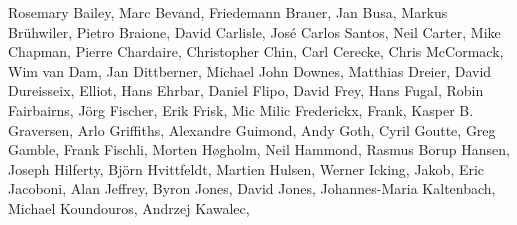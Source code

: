 { \flushleft\small
Rosemary Bailey,        %
Marc Bevand,            %
Friedemann Brauer,      %
Jan Busa,               %
Markus Br\"uhwiler,     %
Pietro Braione,         %
David Carlisle,         %
Jos\'e Carlos Santos,   %
Neil Carter,            %
Mike Chapman,           %
Pierre Chardaire,       %
Christopher Chin,       %
Carl Cerecke,           %
Chris McCormack,        %
Wim van Dam,            %
Jan Dittberner,         %
Michael John Downes,    %
Matthias Dreier,        %
David Dureisseix,       %
Elliot,                 %
Hans Ehrbar,            %
Daniel Flipo,           %
David Frey,             %
Hans Fugal,             %
Robin Fairbairns,       %
J\"org Fischer,        %
Erik Frisk,             %
Mic Milic Frederickx,   %
Frank,                  %
Kasper B. Graversen,    %
Arlo Griffiths,         %
Alexandre Guimond,      %
Andy Goth,              %
Cyril Goutte,           %
Greg Gamble,            %
Frank Fischli,          %
Morten H{\o}gholm,     %
Neil Hammond,           %
Rasmus Borup Hansen,    %
Joseph Hilferty,        %
Bj\"orn Hvittfeldt,     %
Martien Hulsen,         %
Werner Icking,          %
Jakob,                  %
Eric Jacoboni,          %
Alan Jeffrey,           %
Byron Jones,            %
David Jones,            %
Johannes-Maria Kaltenbach, %
Michael Koundouros,     %
Andrzej Kawalec,        %
}
